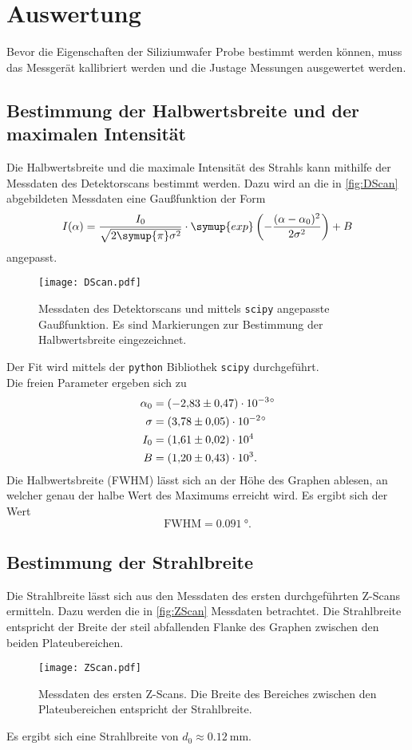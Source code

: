 \section{Auswertung}
\label{sec:Auswertung}
Bevor die Eigenschaften der Siliziumwafer Probe bestimmt werden können, muss das Messgerät kallibriert werden und die Justage Messungen ausgewertet werden.
\subsection{Bestimmung der Halbwertsbreite und der maximalen Intensität}
Die Halbwertsbreite und die maximale Intensität des Strahls kann mithilfe der Messdaten des Detektorscans bestimmt werden.
Dazu wird an die in \autoref{fig:DScan} abgebildeten Messdaten eine Gaußfunktion der Form
\begin{equation*}
  I(\alpha) = \frac{I_0}{\sqrt{2\symup{\pi}\sigma^2}}\cdot \symup{exp}\left(-\frac{(\alpha - \alpha_0)^2}{2\sigma^2}\right) + B
\end{equation*} 
angepasst. 
\begin{figure}
  \centering
  \texttt{[image: DScan.pdf]}
  \caption{Messdaten des Detektorscans und mittels \texttt{scipy} \cite{scipy} angepasste Gaußfunktion. Es sind Markierungen zur Bestimmung der Halbwertsbreite eingezeichnet.}
  \label{fig:DScan}
\end{figure}
Der Fit wird mittels der \texttt{python} Bibliothek \texttt{scipy} \cite{scipy} durchgeführt. \\
Die freien Parameter ergeben sich zu
\begin{align*}
  \alpha_0 &= \qty{-2.83 +-0.47e-3}{\degree} \\
  \sigma &= \qty{3.78 +- 0.05e-2}{\degree} \\
  I_0 &= \num{1.61 +- 0.02e4} \\
  B &= \num{1.20 +- 0.43e3}.
\end{align*}
Die Halbwertsbreite (FWHM) lässt sich an der Höhe des Graphen ablesen, an welcher genau der halbe Wert des Maximums erreicht wird. 
Es ergibt sich der Wert 
\begin{equation*}
  \text{FWHM} = \qty{0.091}{\degree}.
\end{equation*}

\subsection{Bestimmung der Strahlbreite}
Die Strahlbreite lässt sich aus den Messdaten des ersten durchgeführten Z-Scans ermitteln. Dazu werden die in \autoref{fig:ZScan} Messdaten betrachtet.
Die Strahlbreite entspricht der Breite der steil abfallenden Flanke des Graphen zwischen den beiden Plateubereichen.
\begin{figure}
  \centering
  \texttt{[image: ZScan.pdf]}
  \caption{Messdaten des ersten Z-Scans. Die Breite des Bereiches zwischen den Plateubereichen entspricht der Strahlbreite.}
  \label{fig:ZScan}
\end{figure}
Es ergibt sich eine Strahlbreite von $d_0 \approx \qty{0.12}{\milli\metre}$. 

